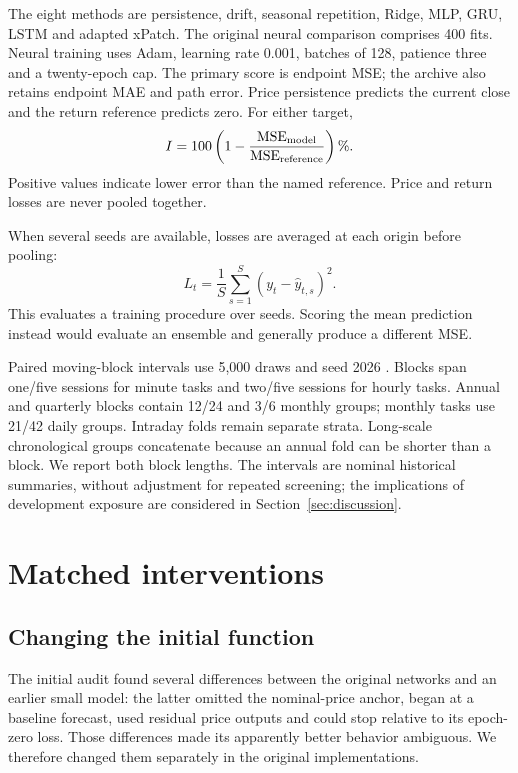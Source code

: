 The eight methods are persistence, drift, seasonal repetition, Ridge, MLP, GRU, LSTM and adapted xPatch. The original neural comparison comprises 400 fits. Neural training uses Adam, learning rate 0.001, batches of 128, patience three and a twenty-epoch cap. The primary score is endpoint MSE; the archive also retains endpoint MAE and path error. Price persistence predicts the current close and the return reference predicts zero. For either target,
\[
I=100\left(1-\frac{\operatorname{MSE}_{\rm model}}
                         {\operatorname{MSE}_{\rm reference}}\right)\%.
\]
Positive values indicate lower error than the named reference. Price and return losses are never pooled together.

When several seeds are available, losses are averaged at each origin before pooling:
\[
L_t=\frac{1}{S}\sum_{s=1}^{S}(y_t-\hat y_{t,s})^2.
\]
This evaluates a training procedure over seeds. Scoring the mean prediction instead would evaluate an ensemble and generally produce a different MSE.

Paired moving-block intervals use 5,000 draws and seed 2026 \cite{r10,r11}. Blocks span one/five sessions for minute tasks and two/five sessions for hourly tasks. Annual and quarterly blocks contain 12/24 and 3/6 monthly groups; monthly tasks use 21/42 daily groups. Intraday folds remain separate strata. Long-scale chronological groups concatenate because an annual fold can be shorter than a block. We report both block lengths. The intervals are nominal historical summaries, without adjustment for repeated screening; the implications of development exposure are considered in Section~\ref{sec:discussion}.

\section{Matched interventions}\label{sec:methods}

\subsection{Changing the initial function}

The initial audit found several differences between the original networks and an earlier small model: the latter omitted the nominal-price anchor, began at a baseline forecast, used residual price outputs and could stop relative to its epoch-zero loss. Those differences made its apparently better behavior ambiguous. We therefore changed them separately in the original implementations.

